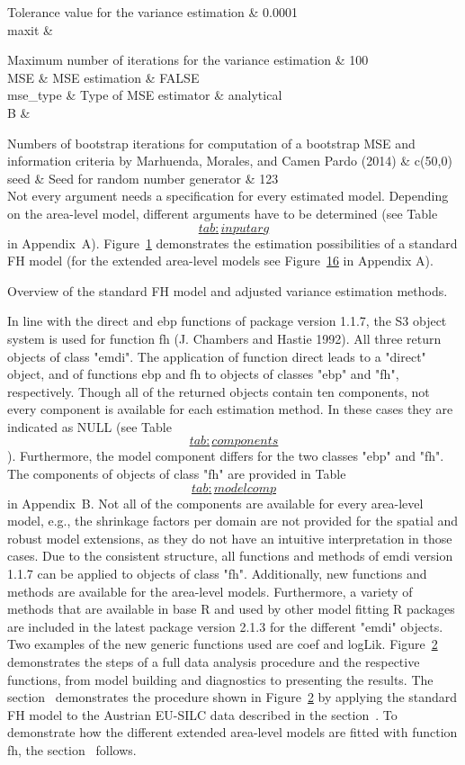 Tolerance value for the variance estimation \& 0.0001\\
maxit \&

Maximum number of iterations for the variance estimation \& 100\\
MSE \& MSE estimation \& FALSE\\
mse\_type \& Type of MSE estimator \& analytical\\
B \&

Numbers of bootstrap iterations for computation of a bootstrap MSE and
information criteria by Marhuenda, Morales, and Camen Pardo (2014) \& c(50,0)\\
seed \& Seed for random number generator \& 123\\

Not every argument needs a specification for every estimated model.
Depending on the area-level model, different arguments have to be
determined (see
Table~\protect\hyperlink{tab:inputarg}{\[tab:inputarg\]} in Appendix~A).
Figure~\protect\hyperlink{fig:flowstandard}{1} demonstrates the estimation possibilities
of a standard FH model (for the extended area-level models see
Figure~\protect\hyperlink{fig:flow}{16} in
Appendix A).

Overview of the standard FH model and adjusted variance
estimation methods.

In line with the direct and ebp functions of package version 1.1.7, the
S3 object system is used for function fh (J. Chambers and Hastie 1992). All three
return objects of class "emdi". The application of function direct
leads to a "direct" object, and of functions ebp and fh to objects of
classes "ebp" and "fh", respectively. Though all of the returned
objects contain ten components, not every component is available for
each estimation method. In these cases they are indicated as NULL (see
Table~\protect\hyperlink{tab:components}{\[tab:components\]}). Furthermore, the model component differs
for the two classes "ebp" and "fh". The components of objects of
class "fh" are provided in
Table~\protect\hyperlink{tab:modelcomp}{\[tab:modelcomp\]} in Appendix~B. Not all of the components are
available for every area-level model, e.g., the shrinkage factors per
domain are not provided for the spatial and robust model extensions, as
they do not have an intuitive interpretation in those cases. Due to the
consistent structure, all functions and methods of emdi version 1.1.7
can be applied to objects of class "fh". Additionally, new functions
and methods are available for the area-level models. Furthermore, a
variety of methods that are available in base R and used by other model
fitting R packages are included in the latest package version 2.1.3 for
the different "emdi" objects. Two examples of the new generic
functions used are coef and logLik.
Figure~\protect\hyperlink{fig:fct}{2}
demonstrates the steps of a full data analysis procedure and the
respective functions, from model building and diagnostics to presenting
the results. The section~ demonstrates the procedure shown in
Figure~\protect\hyperlink{fig:fct}{2} by
applying the standard FH model to the Austrian EU-SILC data described in
the section~. To demonstrate how the different extended area-level
models are fitted with function fh, the section~ follows.


